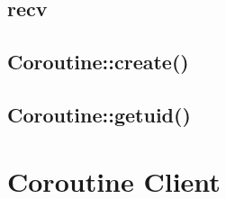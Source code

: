 \subsection{recv}





\subsection{Coroutine::create()}





\subsection{Coroutine::getuid()}



\section{Coroutine Client}

























